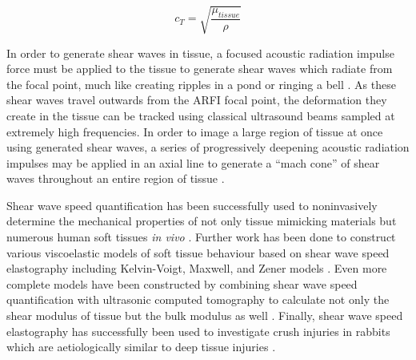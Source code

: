 			\begin{equation}
			\label{equ:litreview_shear_speed}
				c_T = \sqrt{\frac{\mu_{tissue}}{\rho}}
			\end{equation}

			In order to generate shear waves in tissue, a focused acoustic radiation impulse force must be applied to the tissue to generate shear waves which radiate from the focal point, much like creating ripples in a pond or ringing a bell \cite{nightingale03}. As these shear waves travel outwards from the ARFI focal point, the deformation they create in the tissue can be tracked using classical ultrasound beams sampled at extremely high frequencies. In order to image a large region of tissue at once using generated shear waves, a series of progressively deepening acoustic radiation impulses may be applied in an axial line to generate a ``mach cone'' of shear waves throughout an entire region of tissue \cite{bercoff04}.

			Shear wave speed quantification has been successfully used to noninvasively determine the mechanical properties of not only tissue mimicking materials \cite{cao13} but numerous human soft tissues \emph{in vivo} \cite{arda11}. Further work has been done to construct various viscoelastic models of soft tissue behaviour based on shear wave speed elastography including Kelvin-Voigt, Maxwell, and Zener models \cite{chen12,amador12}. Even more complete models have been constructed by combining shear wave speed quantification with ultrasonic computed tomography to calculate not only the shear modulus of tissue but the bulk modulus as well \cite{glozman10}. Finally, shear wave speed elastography has successfully been used to investigate crush injuries in rabbits which are aetiologically similar to deep tissue injuries \cite{lv21}.


